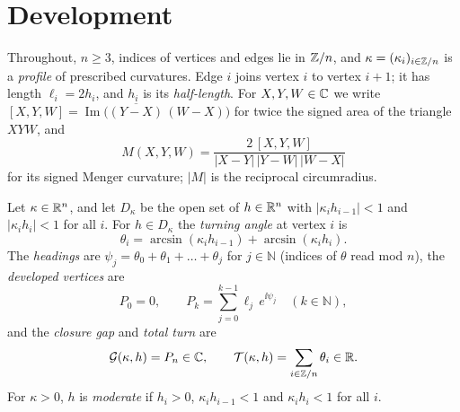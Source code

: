 \section{Development}\label{sec:setup}

Throughout, $n\ge3$, indices of vertices and edges lie in $\mathbb{Z}/n$, and
$\kappa=(\kappa_i)_{i\in\mathbb{Z}/n}$ is a \emph{profile} of prescribed curvatures.
Edge $i$ joins vertex $i$ to vertex $i+1$; it has length $\ell_i=2h_i$, and
$h_i$ is its \emph{half-length}. For $X,Y,W\in\mathbb{C}$ we write
$[X,Y,W]=\operatorname{Im}\bigl(\overline{(Y-X)}\,(W-X)\bigr)$ for twice the
signed area of the triangle $XYW$, and
\begin{equation}\label{eq:menger}
  M(X,Y,W)=\frac{2\,[X,Y,W]}{|X-Y|\,|Y-W|\,|W-X|}
\end{equation}
for its signed Menger curvature; $|M|$ is the reciprocal circumradius.

\begin{definition}\label{def:development}
Let $\kappa\in\mathbb{R}^n$, and let $D_\kappa$ be the open set of $h\in\mathbb{R}^n$ with
$|\kappa_ih_{i-1}|<1$ and $|\kappa_ih_i|<1$ for all $i$. For $h\in D_\kappa$
the \emph{turning angle} at vertex $i$ is
\begin{equation}\label{eq:turning-law}
  \theta_i=\arcsin(\kappa_ih_{i-1})+\arcsin(\kappa_ih_i).
\end{equation}
The \emph{headings} are $\psi_j=\theta_0+\theta_1+\dots+\theta_j$ for
$j\in\mathbb N$ (indices of $\theta$ read mod $n$), the \emph{developed
vertices} are
\begin{equation}\label{eq:vertices}
  P_0=0,\qquad P_k=\sum_{j=0}^{k-1}\ell_j\,e^{\ii\psi_j}\quad(k\in\mathbb N),
\end{equation}
and the \emph{closure gap} and \emph{total turn} are
\begin{equation}\label{eq:gap-turn}
  \mathcal{G}(\kappa,h)=P_n\in\mathbb{C},
  \qquad
  \mathcal{T}(\kappa,h)=\sum_{i\in\mathbb{Z}/n}\theta_i\in\mathbb{R}.
\end{equation}
For $\kappa>0$, $h$ is \emph{moderate} if $h_i>0$, $\kappa_ih_{i-1}<1$ and
$\kappa_ih_i<1$ for all $i$.
\end{definition}

